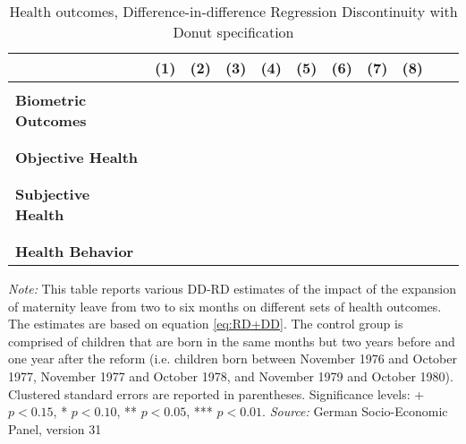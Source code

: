 \begin{landscape}
\begin{table}[htp] \centering
\def\sym#1{\ifmmode^{#1}\else\(^{#1}\)\fi}
\vspace*{\fill}
\caption{Health outcomes, Difference-in-difference Regression Discontinuity with Donut specification}\label{tab:Healthoutcomes_DDRDDONUT}
\begin{tabular}{l*{10}{c}}
\toprule
 &\multicolumn{1}{c}{(1)}&\multicolumn{1}{c}{(2)}&\multicolumn{1}{c}{(3)}&\multicolumn{1}{c}{(4)}&\multicolumn{1}{c}{(5)}&\multicolumn{1}{c}{(6)}&\multicolumn{1}{c}{(7)}&\multicolumn{1}{c}{(8)}\\ 
\midrule\\

\textbf{Biometric Outcomes}\\

	
	\midrule
	
	\\ \\
	\textbf{Objective Health}\\
        
        
     
     \midrule
     
	\\ \\
	\textbf{Subjective Health}\\
	         
        
     
     \midrule
     
	\\ \\
	\textbf{Health Behavior}\\
        
     
     \midrule
     
     \bottomrule
\end{tabular}
\vspace*{\fill}
\begin{minipage}{1.6\textwidth} %
{\footnotesize \textit{Note:} This table reports various DD-RD estimates of the impact of the expansion of maternity leave from two to six months on different sets of health outcomes. The estimates are based on equation \ref{eq:RD+DD}. The control group is comprised of children that are born in the same months but two years before and one year after the reform (i.e. children born between November 1976 and October 1977, November 1977 and October 1978, and November 1979 and October 1980).  \newline
Clustered standard errors are reported in parentheses. Significance levels: + \(p<0.15\), * \(p<0.10\), ** \(p<0.05\), *** \(p<0.01\). \newline \textit{Source: }German Socio-Economic Panel, version 31\par}
\end{minipage}
\end{table}
\end{landscape}



